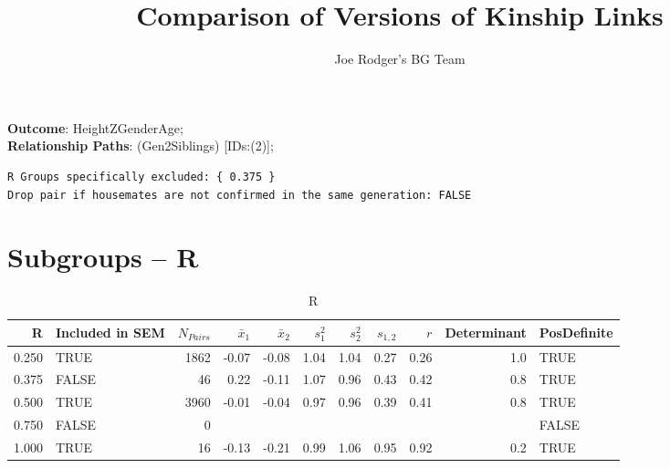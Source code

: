 \documentclass{article}\usepackage[]{graphicx}\usepackage[]{color}
\title{Comparison of Versions of Kinship Links}
\author{Joe Rodger's BG Team}
\makeatletter
\newenvironment{kframe}{%
 \def\at@end@of@kframe{}%
 \ifinner\ifhmode%
  \def\at@end@of@kframe{\end{minipage}}%
  \begin{minipage}{\columnwidth}%
 \fi\fi%
 \def\FrameCommand##1{\hskip\@totalleftmargin \hskip-\fboxsep
 \colorbox{shadecolor}{##1}\hskip-\fboxsep
     \hskip-\linewidth \hskip-\@totalleftmargin \hskip\columnwidth}%
 \MakeFramed {\advance\hsize-\width
   \@totalleftmargin\z@ \linewidth\hsize
   \@setminipage}}%
 {\par\unskip\endMakeFramed%
 \at@end@of@kframe}
\newenvironment{knitrout}{}{} %
\makeatother
\begin{document}
\maketitle
\setcounter{totalnumber}{8} %

\setlength{\parindent}{0pt}%














\textbf{Outcome}: HeightZGenderAge;\\
\textbf{Relationship Paths}: (Gen2Siblings) [IDs:(2)];\\

\begin{knitrout}
\color{fgcolor}\begin{kframe}
\begin{verbatim}
R Groups specifically excluded: { 0.375 }
Drop pair if housemates are not confirmed in the same generation: FALSE
\end{verbatim}
\end{kframe}
\end{knitrout}

\section{Subgroups --  R }%
\begin{table}[ht]
\centering
\begin{tabular}{rlrrrrrrrrl}
  \hline
R & Included in SEM & $N_{Pairs}$ & $\bar{x}_1$ & $\bar{x}_2$ & $s_1^2$ & $s_2^2$ & $s_{1,2}$ & $r$ & Determinant & PosDefinite \\ 
  \hline
0.250 & TRUE & 1862 & -0.07 & -0.08 & 1.04 & 1.04 & 0.27 & 0.26 & 1.0 & TRUE \\ 
  0.375 & FALSE & 46 & 0.22 & -0.11 & 1.07 & 0.96 & 0.43 & 0.42 & 0.8 & TRUE \\ 
  0.500 & TRUE & 3960 & -0.01 & -0.04 & 0.97 & 0.96 & 0.39 & 0.41 & 0.8 & TRUE \\ 
  0.750 & FALSE & 0 &  &  &  &  &  &  &  & FALSE \\ 
  1.000 & TRUE & 16 & -0.13 & -0.21 & 0.99 & 1.06 & 0.95 & 0.92 & 0.2 & TRUE \\ 
   \hline
\end{tabular}
\caption{R} 
\end{table}
\end{document}
